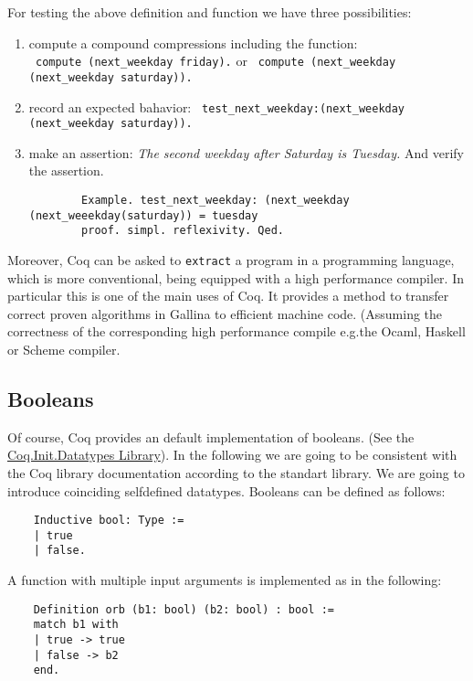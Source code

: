   For testing the above definition and function we have three possibilities:   
   \begin{enumerate}
   \item compute a compound compressions including the function:\\
   \lstinline! compute (next_weekday friday).! or 
   \lstinline! compute (next_weekday (next_weekday saturday)).!
   \item record an expected bahavior: \lstinline! test_next_weekday:(next_weekday (next_weekday saturday)).! 
   \item make an assertion: {\itshape The second weekday after Saturday is Tuesday.} And verify the assertion. 
   \begin{lstlisting}
   		Example. test_next_weekday: (next_weekday (next_weeekday(saturday)) = tuesday 
   		proof. simpl. reflexivity. Qed.
   \end{lstlisting}
   \end{enumerate}   

    Moreover, Coq can be asked to \lstinline!extract! a program in a programming language, which is more conventional, being equipped with a high performance compiler.
    In particular this is one of the main uses of Coq. 
    It provides a method to transfer correct proven algorithms in Gallina to efficient machine code.
    (Assuming the correctness of the corresponding high performance compile e.g.the Ocaml, Haskell or Scheme compiler. 


\subsection{Booleans}

    Of course, Coq provides an default implementation of booleans. (See the \href{https://www.cs.princeton.edu/courses/archive/fall07/cos595/stdlib/html/Coq.Init.Datatypes.html}{Coq.Init.Datatypes Library}). %
    In the following we are going to be consistent with the Coq library documentation according to the standart library. We are going to introduce coinciding selfdefined datatypes.
    Booleans can be defined as follows:
    
    \label{Def:booleans}
    \begin{lstlisting}    
    Inductive bool: Type :=
    | true
    | false.
    \end{lstlisting}
    
    A function with multiple input arguments is implemented as in the following:
    \begin{lstlisting}
    Definition orb (b1: bool) (b2: bool) : bool :=
    match b1 with
    | true -> true
    | false -> b2
    end.
    \end{lstlisting}
     
